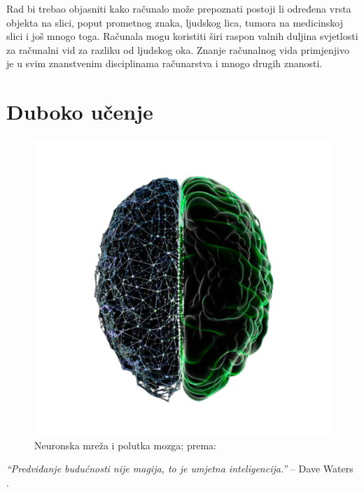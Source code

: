 \documentclass[]{foi} %
\begin{document}
Rad bi trebao objasniti kako računalo može prepoznati postoji li određena vrsta objekta na slici, poput prometnog znaka, ljudskog lica, tumora na medicinskoj slici i još mnogo toga.
Računala mogu koristiti širi raspon valnih duljina svjetlosti za računalni vid za razliku od ljudskog oka. Znanje računalnog vida primjenjivo je u svim znanstvenim disciplinama računarstva i mnogo drugih znanosti.

\chapter{Duboko učenje}

\hspace{20 mm}

\begin{figure}[!ht]
    \centering
    \includegraphics[width=1\textwidth]{slike/mozak.png}
    \caption{Neuronska mreža i polutka mozga; prema: \cite{deep}}
    \label{fig:struce}
\end{figure}

\hspace{20 mm}

\begin{center}
\textit{“Predviđanje budućnosti nije magija, to je umjetna inteligencija.”} -- Dave Waters \cite{deep}.    
\end{center}
\end{document}
